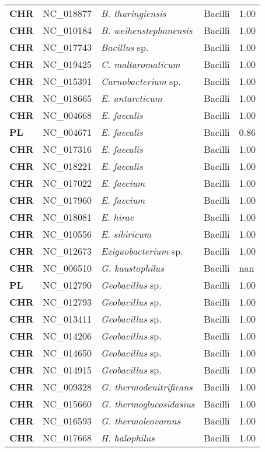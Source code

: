 \begin{adjustwidth}{-3cm}{2cm}
{\begin{supertabular}{>{\bfseries}l|p{0.1\textwidth}p{0.14\textwidth}l|l}
CHR & NC\_018877 & \textit{B. thuringiensis} & Bacilli & 1.00\\
CHR & NC\_010184 & \textit{B. weihenstephanensis} & Bacilli & 1.00\\
CHR & NC\_017743 & \textit{Bacillus} sp. & Bacilli & 1.00\\
CHR & NC\_019425 & \textit{C. maltaromaticum} & Bacilli & 1.00\\
CHR & NC\_015391 & \textit{Carnobacterium} sp. & Bacilli & 1.00\\
CHR & NC\_018665 & \textit{E. antarcticum} & Bacilli & 1.00\\
CHR & NC\_004668 & \textit{E. faecalis} & Bacilli & 1.00\\
PL & NC\_004671 & \textit{E. faecalis} & Bacilli & 0.86\\
CHR & NC\_017316 & \textit{E. faecalis} & Bacilli & 1.00\\
CHR & NC\_018221 & \textit{E. faecalis} & Bacilli & 1.00\\
CHR & NC\_017022 & \textit{E. faecium} & Bacilli & 1.00\\
CHR & NC\_017960 & \textit{E. faecium} & Bacilli & 1.00\\
CHR & NC\_018081 & \textit{E. hirae} & Bacilli & 1.00\\
CHR & NC\_010556 & \textit{E. sibiricum} & Bacilli & 1.00\\
CHR & NC\_012673 & \textit{Exiguobacterium} sp. & Bacilli & 1.00\\
CHR & NC\_006510 & \textit{G. kaustophilus} & Bacilli & nan\\
PL & NC\_012790 & \textit{Geobacillus} sp. & Bacilli & 1.00\\
CHR & NC\_012793 & \textit{Geobacillus} sp. & Bacilli & 1.00\\
CHR & NC\_013411 & \textit{Geobacillus} sp. & Bacilli & 1.00\\
CHR & NC\_014206 & \textit{Geobacillus} sp. & Bacilli & 1.00\\
CHR & NC\_014650 & \textit{Geobacillus} sp. & Bacilli & 1.00\\
CHR & NC\_014915 & \textit{Geobacillus} sp. & Bacilli & 1.00\\
CHR & NC\_009328 & \textit{G. thermodenitrificans} & Bacilli & 1.00\\
CHR & NC\_015660 & \textit{G. thermoglucosidasius} & Bacilli & 1.00\\
CHR & NC\_016593 & \textit{G. thermoleovorans} & Bacilli & 1.00\\
CHR & NC\_017668 & \textit{H. halophilus} & Bacilli & 1.00\\

\end{supertabular}}
\end{adjustwidth}
